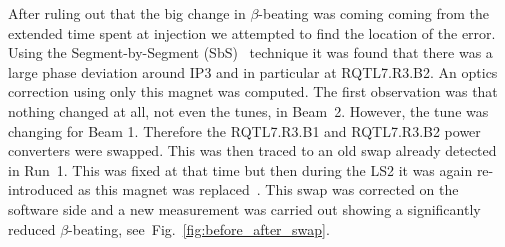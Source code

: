 \documentclass[a4paper]{cernatsnote}
\begin{document}
After ruling out that the big change in $\beta$-beating was coming coming from the extended time spent at injection we attempted to find the location of the error. Using the Segment-by-Segment (SbS)~\cite{first} technique it was found that there was a large phase deviation around IP3 and in particular at RQTL7.R3.B2. An optics correction using only this magnet was computed. The first observation was that nothing changed at all, not even the tunes, in Beam~2. However, the tune was changing for Beam 1. Therefore the RQTL7.R3.B1 and RQTL7.R3.B2 power converters were swapped. This was then traced to an old swap already detected in Run~1. This was fixed at that time but then during the LS2 it was again re-introduced as this magnet was replaced~\cite{first, michiEvian}. This swap was corrected on the software side and a new measurement was carried out showing a significantly reduced $\beta$-beating, see~Fig.~\ref{fig:before_after_swap}.
\end{document}
